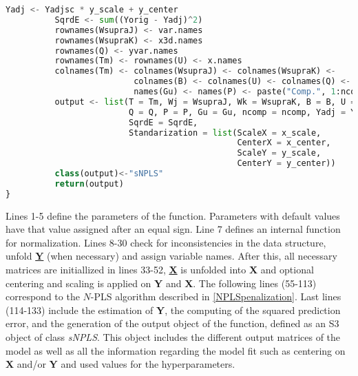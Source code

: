 \begin{scriptsize}
\begin{lstlisting}[language=Python, caption=sNPLS main function]
          Yadj <- Yadjsc * y_scale + y_center
          SqrdE <- sum((Yorig - Yadj)^2)
          rownames(WsupraJ) <- var.names
          rownames(WsupraK) <- x3d.names
          rownames(Q) <- yvar.names
          rownames(Tm) <- rownames(U) <- x.names
          colnames(Tm) <- colnames(WsupraJ) <- colnames(WsupraK) <- 
                          colnames(B) <- colnames(U) <- colnames(Q) <- 
                          names(Gu) <- names(P) <- paste("Comp.", 1:ncomp)
          output <- list(T = Tm, Wj = WsupraJ, Wk = WsupraK, B = B, U = U, 
                         Q = Q, P = P, Gu = Gu, ncomp = ncomp, Yadj = Yadj, 
                         SqrdE = SqrdE, 
                         Standarization = list(ScaleX = x_scale, 
                                               CenterX = x_center,
                                               ScaleY = y_scale, 
                                               CenterY = y_center))
          class(output)<-"sNPLS"
          return(output)
}
\end{lstlisting}
\end{scriptsize}

Lines 1-5 define the parameters of the function. Parameters with default values have that value assigned after an equal sign. Line 7 defines an internal function for normalization. Lines 8-30 check for inconsistencies in the data structure, unfold \textbf{\underline{Y}} (when necessary) and assign variable names. After this, all necessary matrices are initiallized in lines 33-52, \textbf{\underline{X}} is unfolded into \textbf{X} and optional centering and scaling is applied on \textbf{Y} and \textbf{X}. The following lines (55-113) correspond to the $N$-PLS algorithm described in \autoref{NPLSpenalization}. Last lines (114-133) include the estimation of \textbf{Y}, the computing of the squared prediction error, and the generation of the output object of the function, defined as an S3 object of class \textit{sNPLS}. This object includes the different output matrices of the model as well as all the information regarding the model fit such as centering on \textbf{X} and/or \textbf{Y} and used values for the hyperparameters. 


